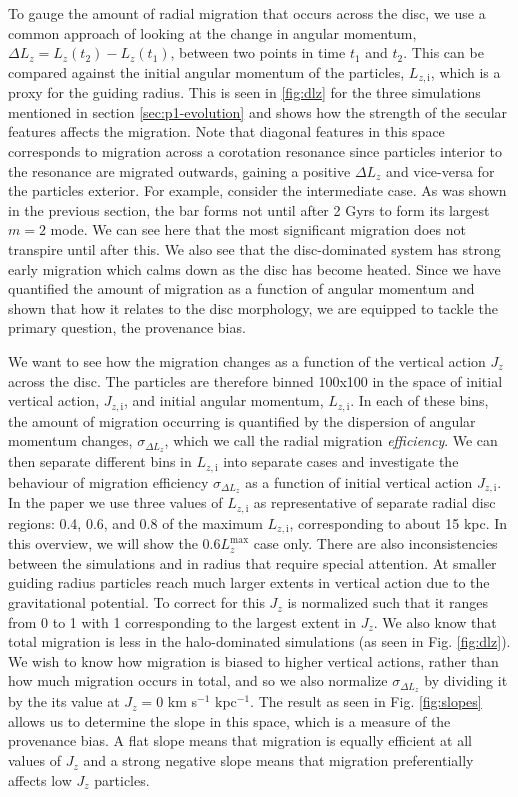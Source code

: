 To gauge the amount of radial migration that occurs across the disc, we use a common approach of looking at the change in angular momentum, $\Delta L_z = L_z(t_2) - L_z(t_1)$, between two points in time $t_1$ and $t_2$. This can be compared against the initial angular momentum of the particles, $L_{z, \mathrm{i}}$, which is a proxy for the guiding radius. This is seen in \ref{fig:dlz} for the three simulations mentioned in section \ref{sec:p1-evolution} and shows how the strength of the secular features affects the migration. Note that diagonal features in this space corresponds to migration across a corotation resonance since particles interior to the resonance are migrated outwards, gaining a positive $\Delta L_z$ and vice-versa for the particles exterior. For example, consider the intermediate case. As was shown in the previous section, the bar forms not until after 2 Gyrs to form its largest $m=2$ mode. We can see here that the most significant migration does not transpire until after this. We also see that the disc-dominated system has strong early migration which calms down as the disc has become heated. Since we have quantified the amount of migration as a function of angular momentum and shown that how it relates to the disc morphology, we are equipped to tackle the primary question, the provenance bias.

We want to see how the migration changes as a function of the vertical action $J_z$ across the disc. The particles are therefore binned 100x100 in the space of initial vertical action, $J_{z, \mathrm{i}}$, and initial angular momentum, $L_{z, \mathrm{i}}$. In each of these bins, the amount of migration occurring is quantified by the dispersion of angular momentum changes, $\sigma_{\Delta L_z}$, which we call the radial migration \textit{efficiency}. We can then separate different bins in $L_{z, \mathrm{i}}$ into separate cases and investigate the behaviour of migration efficiency $\sigma_{\Delta L_z}$ as a function of initial vertical action $J_{z, \mathrm{i}}$. In the paper we use three values of $L_{z, \mathrm{i}}$ as representative of separate radial disc regions: 0.4, 0.6, and 0.8 of the maximum $L_{z, \mathrm{i}}$, corresponding to about 15 kpc. In this overview, we will show the $0.6 L_z^\mathrm{max}$ case only. There are also inconsistencies between the simulations and in radius that require special attention. At smaller guiding radius particles reach much larger extents in vertical action due to the gravitational potential. To correct for this $J_z$ is normalized such that it ranges from 0 to 1 with 1 corresponding to the largest extent in $J_z$. We also know that total migration is less in the halo-dominated simulations (as seen in Fig. \ref{fig:dlz}). We wish to know how migration is biased to higher vertical actions, rather than how much migration occurs in total, and so we also normalize $\sigma_{\Delta L_z}$ by dividing it by the its value at $J_z = 0$ km s$^{-1}$ kpc$^{-1}$. The result as seen in Fig. \ref{fig:slopes} allows us to determine the slope in this space, which is a measure of the provenance bias. A flat slope means that migration is equally efficient at all values of $J_z$ and a strong negative slope means that migration preferentially affects low $J_z$ particles.

